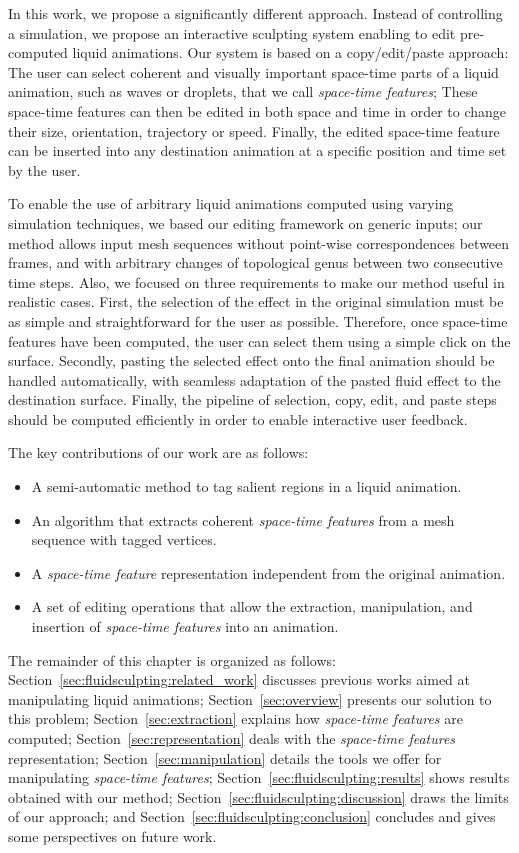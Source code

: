 In this work, we propose a significantly different approach. 
Instead of controlling a simulation, we propose an interactive sculpting system enabling to edit pre-computed liquid animations.
Our system is based on a copy/edit/paste approach:
The user can select coherent and visually important space-time parts of a liquid animation, such as waves or droplets, that we call \emph{space-time features};
These space-time features can then be edited in both space and time in order to change their size, orientation, trajectory or speed. 
Finally, the edited space-time feature can be inserted into any destination animation at a specific position and time set by the user.

To enable the use of arbitrary liquid animations computed using varying simulation techniques, we based our editing framework on generic inputs; our method allows input mesh sequences without point-wise correspondences between frames, and with arbitrary changes of topological genus between two consecutive time steps. 
Also, we focused on three requirements to make our method useful in realistic cases.
First, the selection of the effect in the original simulation must be as simple and straightforward for the user as possible. 
Therefore, once space-time features have been computed, the user can select them using a simple click on the surface.
Secondly, pasting the selected effect onto the final animation should be handled automatically, with seamless adaptation of the pasted fluid effect to the destination surface. 
Finally, the pipeline of selection, copy, edit, and paste steps should be computed efficiently in order to enable interactive user feedback. 

The key contributions of our work are as follows:
\begin{itemize}
    \item A semi-automatic method to tag salient regions in a liquid animation.
    \item An algorithm that extracts coherent \emph{space-time features} from a mesh sequence with tagged vertices.
    \item A \emph{space-time feature} representation independent from the original animation.
    \item A set of editing operations that allow the extraction, manipulation, and insertion of \emph{space-time features} into an animation.
\end{itemize}

The remainder of this chapter is organized as follows:
Section~\ref{sec:fluidsculpting:related_work} discusses previous works aimed at manipulating liquid animations;
Section~\ref{sec:overview} presents our solution to this problem;
Section~\ref{sec:extraction} explains how \emph{space-time features} are computed; 
Section~\ref{sec:representation} deals with the \emph{space-time features} representation; 
Section~\ref{sec:manipulation} details the tools we offer for manipulating \emph{space-time features}; 
Section~\ref{sec:fluidsculpting:results} shows results obtained with our method; 
Section~\ref{sec:fluidsculpting:discussion} draws the limits of our approach; 
and Section~\ref{sec:fluidsculpting:conclusion} concludes and gives some perspectives on future work.

